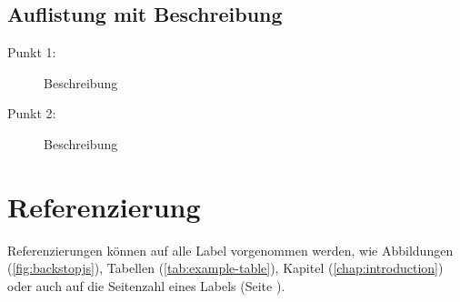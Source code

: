 \subsection{Auflistung mit Beschreibung}
\begin{description}
    \item[Punkt 1:]
        Beschreibung

    \item[Punkt 2:]
        Beschreibung
\end{description}

\section{Referenzierung}
Referenzierungen können auf alle Label vorgenommen werden, wie Abbildungen (\autoref{fig:backstopjs}), Tabellen (\autoref{tab:example-table}), Kapitel (\autoref{chap:introduction}) oder auch auf die Seitenzahl eines Labels (Seite \pageref{fig:backstopjs}).